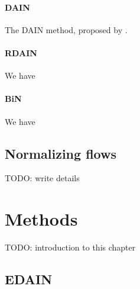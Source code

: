 \documentclass{statsmsc}
\begin{document}
\subsubsection{DAIN}%
\label{ssub:DAIN}

The \ac{DAIN} method, proposed by \cite{dain}.

\subsubsection{RDAIN}%
\label{ssub:RDAIN}

We have \cite{rdain}

\subsubsection{BiN}%
\label{ssub:BiN}

We have \cite{bin}





\section{Normalizing flows}%
\label{sec:Normalizing flows}

TODO: write details



\chapter{Methods} %

TODO: introduction to this chapter

\section{EDAIN}%
\label{sec:EDAIN-method}

\end{document}
